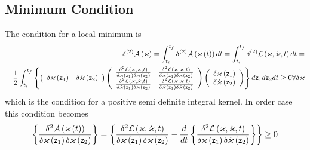 \subsection{Minimum Condition}

The condition for a local minimum is 
\begin{eqnarray}
&&\delta ^{\left( 2\right) }{\cal A}\left( \varkappa \right)
=\int_{t_{i}}^{t_{f}}\delta ^{\left( 2\right) }{\cal \dot{A}}\left(
\varkappa \left( t\right) \right) dt=\int_{t_{i}}^{t_{f}}\delta ^{\left(
2\right) }{\cal L}\left( \varkappa ,\dot{\varkappa},t\right) dt=  \nonumber
\\
&&\frac{1}{2}\int_{t_{i}}^{t_{f}}\left\{ \left( 
\begin{array}{cc}
\delta \varkappa \left( {\sf z}_{1}\right)  & \delta \dot{\varkappa}\left( 
{\sf z}_{2}\right) 
\end{array}%
\right) \left( 
\begin{array}{cc}
\frac{\delta ^{2}{\cal L}\left( \varkappa ,\dot{\varkappa},t\right) }{\delta
\varkappa \left( {\sf z}_{1}\right) \delta \varkappa \left( {\sf z}%
_{2}\right) } & \frac{\delta ^{2}{\cal L}\left( \varkappa ,\dot{\varkappa}%
,t\right) }{\delta \varkappa \left( {\sf z}_{1}\right) \delta \dot{\varkappa}%
\left( {\sf z}_{2}\right) } \\ 
\frac{\delta ^{2}{\cal L}\left( \varkappa ,\dot{\varkappa},t\right) }{\delta 
\dot{\varkappa}\left( {\sf z}_{1}\right) \delta \varkappa \left( {\sf z}%
_{2}\right) } & \frac{\delta ^{2}{\cal L}\left( \varkappa ,\dot{\varkappa}%
,t\right) }{\delta \dot{\varkappa}\left( {\sf z}_{1}\right) \delta \dot{%
\varkappa}\left( {\sf z}_{2}\right) }%
\end{array}%
\right) \left( 
\begin{array}{c}
\delta \varkappa \left( {\sf z}_{1}\right)  \\ 
\delta \dot{\varkappa}\left( {\sf z}_{2}\right) 
\end{array}%
\right) \right\} d{\sf z}_{1}d{\sf z}_{2}dt\geq 0\forall \delta \varkappa 
\end{eqnarray}%
which is the condition for a positive semi definite integral kernel. In
order case this condition becomes 
\begin{equation}
\left\{ \frac{\delta ^{2}{\cal \dot{A}}\left( \varkappa \left( t\right)
\right) }{\delta \varkappa \left( {\sf z}_{1}\right) \delta \varkappa \left( 
{\sf z}_{2}\right) }\right\} =\left\{ \frac{\delta ^{2}{\cal L}\left( {\cal %
\varkappa },{\cal \dot{\varkappa}},t\right) }{\delta \varkappa \left( {\sf z}%
_{1}\right) \delta \varkappa \left( {\sf z}_{2}\right) }-\frac{d}{dt}\left\{ 
\frac{\delta ^{2}{\cal L}\left( \varkappa ,\dot{\varkappa},t\right) }{\delta
\varkappa \left( {\sf z}_{1}\right) \delta \dot{\varkappa}\left( {\sf z}%
_{2}\right) }\right\} \right\} \geq 0  \label{ActHess}
\end{equation}%
